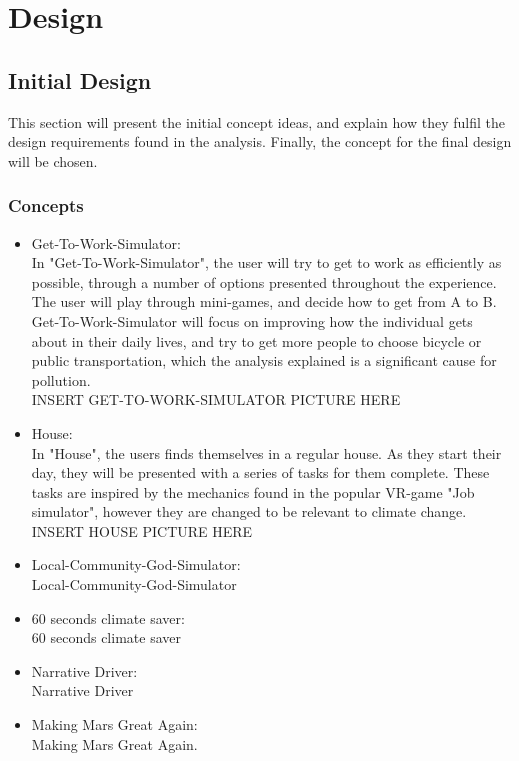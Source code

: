 \chapter{Design}

\section{Initial Design}
This section will present the initial concept ideas, and explain how they fulfil the design requirements found in the analysis. Finally, the concept for the final design will be chosen.

\subsection{Concepts}

\begin{itemize}
    \item Get-To-Work-Simulator:\\
    In "Get-To-Work-Simulator", the user will try to get to work as efficiently as possible, through a number of options presented throughout the experience. The user will play through mini-games, and decide how to get from A to B. Get-To-Work-Simulator will focus on improving how the individual gets about in their daily lives, and try to get more people to choose bicycle or public transportation, which the analysis explained is a significant cause for pollution.\\
    INSERT GET-TO-WORK-SIMULATOR PICTURE HERE\\
    \item House:\\
    In "House", the users finds themselves in a regular house. As they start their day, they will be presented with a series of tasks for them complete. These tasks are inspired by the mechanics found in the popular VR-game "Job simulator", however they are changed to be relevant to climate change.\\
    INSERT HOUSE PICTURE HERE\\
    \item Local-Community-God-Simulator:\\
    Local-Community-God-Simulator
    \item 60 seconds climate saver:\\
    60 seconds climate saver
    \item Narrative Driver:\\
    Narrative Driver
    \item Making Mars Great Again:\\
    Making Mars Great Again.
\end{itemize}

